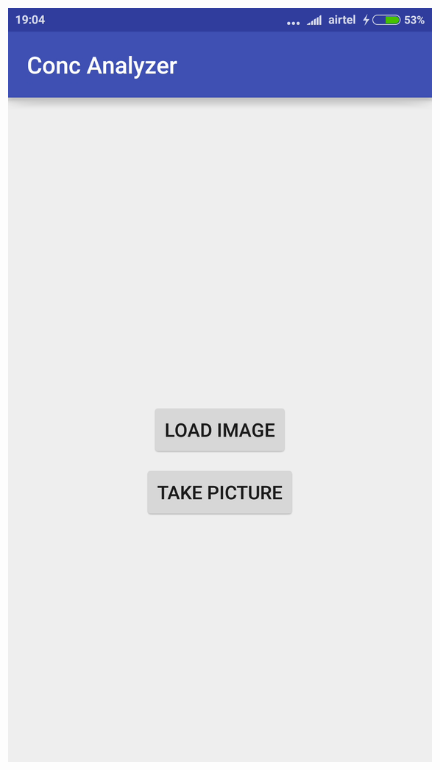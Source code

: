 \documentclass[runningheads,a4paper]{llncs}
\begin{document}
\begin{figure}[h!]
\begin{center}
\includegraphics[scale=0.12]{conc1}

\end{center}
\end{figure}
\end{document}
